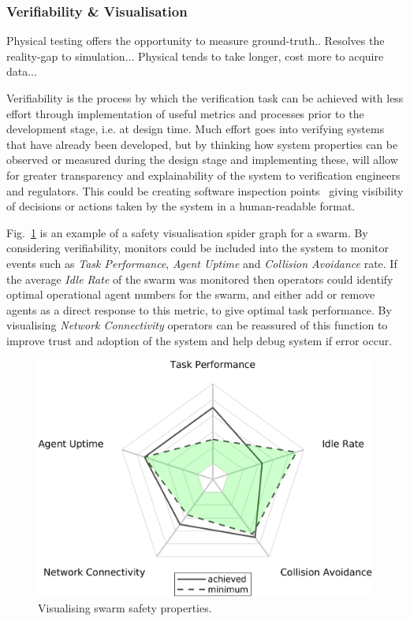 \documentclass[lettersize,journal]{IEEEtran}
\begin{document}
\subsubsection{Verifiability & Visualisation}

Physical testing offers the opportunity to measure ground-truth..
Resolves the reality-gap to simulation...
Physical tends to take longer, cost more to acquire data...

Verifiability is the process by which the verification task can be achieved with less effort through implementation of useful metrics and processes prior to the  development stage, i.e. at design time. Much effort goes into verifying systems that have already been developed, but by thinking how system properties can be observed or measured during the design stage and implementing these, will allow for greater transparency and explainability of the system to verification engineers and regulators. This could be creating software inspection points~\cite{koopman2018toward} giving visibility of decisions or actions taken by the system in a human-readable format. 

Fig.~\ref{swarm_trust_spider} is an example of a safety visualisation spider graph for a swarm. By considering verifiability, monitors could be included into the system to monitor events such as \emph{Task Performance}, \emph{Agent Uptime} and \emph{Collision Avoidance} rate. If the average \emph{Idle Rate} of the swarm was monitored then operators could identify optimal operational agent numbers for the swarm, and either add or remove agents as a direct response to this metric, to give optimal task performance. By visualising \emph{Network Connectivity} operators can be reassured of this function to improve trust and adoption of the system and help debug system if error occur. 

\begin{figure}
	\centering
	\includegraphics[width=1.0\textwidth]{figures/swarm_trust_spider.png}
	\caption{Visualising swarm safety properties.}
	\label{swarm_trust_spider}
\end{figure}
\end{document}
